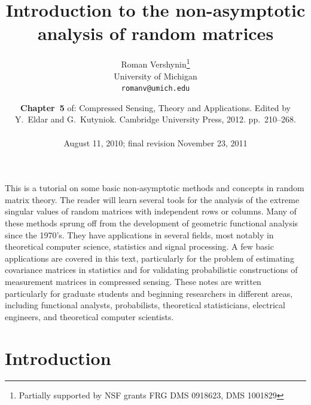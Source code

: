 \documentclass[10pt, openany]{book}
\theoremstyle{remark}
\begin{document}
\title{Introduction to the non-asymptotic analysis of random matrices}

\author{Roman Vershynin\footnote{Partially supported by NSF grants FRG DMS 0918623, DMS 1001829} \\
University of Michigan\\
\texttt{romanv@umich.edu}
}

\date{
  \small{{\bf Chapter~5} of: Compressed Sensing, Theory and Applications. Edited by Y.~Eldar and G.~Kutyniok. Cambridge University Press, 2012.
    pp.~210--268.}\\
  \qquad \vspace{4cm} \\ 
  August 11, 2010; final revision November 23, 2011
  }

\maketitle

\tableofcontents 

\clearpage

\noindent This is a tutorial on some basic non-asymptotic methods and concepts in random matrix theory. 
The reader will learn several tools for the analysis of the extreme singular values of random matrices 
with independent rows or columns. Many of these methods sprung off from the development of 
geometric functional analysis since the 1970's. They have applications in several fields, 
most notably in theoretical computer science, statistics and signal processing. 
A few basic applications are covered in this text, particularly for the problem of estimating covariance matrices 
in statistics and for validating probabilistic constructions of measurement matrices in compressed sensing. 
These notes are written particularly for graduate students and beginning researchers in different areas, 
including functional analysts, probabilists, theoretical statisticians, electrical engineers, 
and theoretical computer scientists. 




\setcounter{chapter}{5}

\section{Introduction}					\label{s: introduction}
\end{document}
